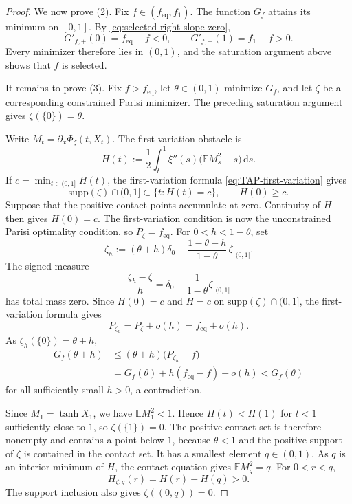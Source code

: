 \documentclass[a4paper,10pt,reqno]{amsart}
\numberwithin{equation}{section}
\newcommand{\dE}{\mathbb{E}}%
\newcommand{\supp}{\mathrm{supp}}
\newcommand{\dd}{\mathrm{d}}
\newcommand{\eq}{\mathrm{eq}}
\begin{document}
\begin{proof}
		We now prove \textup{(2)}. Fix \(f\in(f_{\eq},f_1)\). The function
		\(G_f\) attains its minimum on \([0,1]\). By
		\eqref{eq:selected-right-slope-zero},
		\[
		G'_{f,+}(0)=f_{\eq}-f<0,
		\qquad
		G'_{f,-}(1)=f_1-f>0.
		\]
		Every minimizer therefore lies in \((0,1)\), and the saturation argument
		above shows that \(f\) is selected.
		
		It remains to prove \textup{(3)}. Fix \(f>f_{\eq}\), let
		\(\theta\in(0,1)\) minimize \(G_f\), and let \(\zeta\) be a
		corresponding constrained Parisi minimizer. The preceding
		saturation argument gives \(\zeta(\{0\})=\theta\).
		
		Write \(M_t=\partial_x\Phi_\zeta(t,X_t)\). The first-variation obstacle is
		\[
		H(t)
		:=
		\frac12\int_t^1\xi''(s)\bigl(\dE M_s^2-s\bigr)\,\dd s.
		\]
		If \(c=\min_{t\in(0,1]}H(t)\), the first-variation formula
		\eqref{eq:TAP-first-variation} gives
		\[
		\supp(\zeta)\cap(0,1]\subset\{t:H(t)=c\},
		\qquad
		H(0)\ge c.
		\]
		Suppose that the positive contact points accumulate at zero. Continuity
		of \(H\) then gives \(H(0)=c\). The first-variation condition is now the
		unconstrained Parisi optimality condition, so \(P_\zeta=f_{\eq}\).
		For \(0<h<1-\theta\), set
		\[
		\zeta_h
		:=
		(\theta+h)\delta_0
		+
		\frac{1-\theta-h}{1-\theta}\,
		\zeta|_{(0,1]}.
		\]
		The signed measure
		\[
		\frac{\zeta_h-\zeta}{h}
		=
		\delta_0-\frac1{1-\theta}\zeta|_{(0,1]}
		\]
		has total mass zero. Since \(H(0)=c\) and
		\(H=c\) on \(\supp(\zeta)\cap(0,1]\), the first-variation formula
		gives
		\[
		P_{\zeta_h}=P_\zeta+o(h)=f_{\eq}+o(h).
		\]
		As \(\zeta_h(\{0\})=\theta+h\),
		\[
		\begin{aligned}
			G_f(\theta+h)
			&\le(\theta+h)\bigl(P_{\zeta_h}-f\bigr)\\
			&=G_f(\theta)+h(f_{\eq}-f)+o(h)
			<G_f(\theta)
		\end{aligned}
		\]
		for all sufficiently small \(h>0\), a contradiction.
		
		Since \(M_1=\tanh X_1\), we have \(\dE M_1^2<1\). Hence
		\(H(t)<H(1)\) for \(t<1\) sufficiently close to \(1\), so
		\(\zeta(\{1\})=0\). The positive contact set is therefore nonempty and
		contains a point below \(1\), because \(\theta<1\) and the positive
		support of \(\zeta\) is contained in the contact set. It has a smallest
		element \(q\in(0,1)\). As \(q\) is an interior minimum of \(H\), the
		contact equation gives \(\dE M_q^2=q\). For \(0<r<q\),
		\[
		H_{\zeta,q}(r)=H(r)-H(q)>0.
		\]
		The support inclusion also gives \(\zeta((0,q))=0\).
	\end{proof}
	
\end{document}
